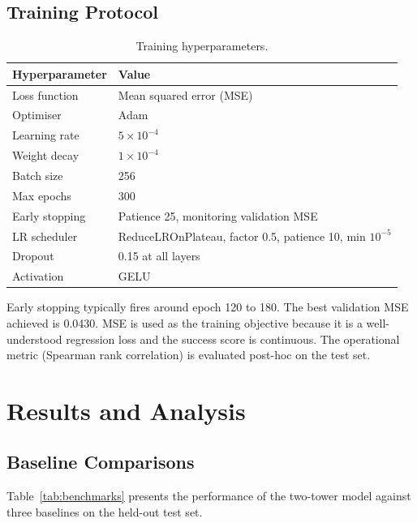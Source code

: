 \documentclass[12pt, a4paper, oneside]{report}
\begin{document}
\section{Training Protocol}

\begin{table}[H]
\centering
\caption{Training hyperparameters.}
\label{tab:training}
\begin{tabular}{ll}
\toprule
\textbf{Hyperparameter} & \textbf{Value} \\
\midrule
Loss function       & Mean squared error (MSE) \\
Optimiser           & Adam \\
Learning rate       & $5 \times 10^{-4}$ \\
Weight decay        & $1 \times 10^{-4}$ \\
Batch size          & 256 \\
Max epochs          & 300 \\
Early stopping      & Patience 25, monitoring validation MSE \\
LR scheduler        & ReduceLROnPlateau, factor 0.5, patience 10, min $10^{-5}$ \\
Dropout             & 0.15 at all layers \\
Activation          & GELU \\
\bottomrule
\end{tabular}
\end{table}

Early stopping typically fires around epoch 120 to 180. The best validation MSE achieved is 0.0430. MSE is used as the training objective because it is a well-understood regression loss and the success score is continuous. The operational metric (Spearman rank correlation) is evaluated post-hoc on the test set.

\chapter{Results and Analysis}
\label{chap:results}

\section{Baseline Comparisons}

Table~\ref{tab:benchmarks} presents the performance of the two-tower model against three baselines on the held-out test set.
\end{document}
